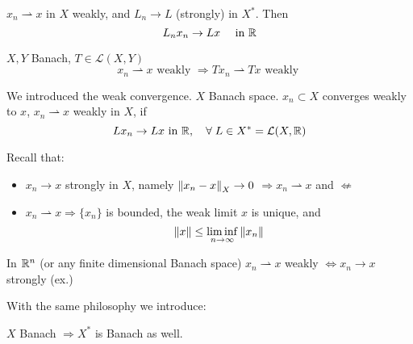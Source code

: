 \begin{proposition}
    \(x_n \rightharpoonup x \) in \(X\) weakly, and \(L_n \to L\) (strongly) in \(X^*\). Then
    \[
        L_n x_n \to Lx \quad \text{ in } \mathbb{R}
    \]
\end{proposition}
\begin{proposition}
    \(X, Y\) Banach, \(T \in \mathcal{L}(X, Y)\)
    \[
        x_n \rightharpoonup x \text{ weakly } \Rightarrow Tx_n \rightharpoonup Tx \text{ weakly }
    \]
\end{proposition}

We introduced the weak convergence. \(X\) Banach space. \({x_n} \subset X\) converges weakly to \(x\), \(x_n \rightharpoonup x\) weakly in \(X\), if 
\[
    L x_n \to Lx \text { in } \mathbb{R}, \quad \forall\; L \in X^* = \mathcal{L}(X, \mathbb{R})
\]

Recall that: 
\begin{itemize}
    \item \(x_n \to x \) strongly in \(X\), namely \(\norm{x_n - x}_X \to 0\) \(\Rightarrow x_n \rightharpoonup x\) and \(\nLeftarrow\)
    \item \(x_n \rightharpoonup x \Rightarrow \{x_n\}\) is bounded, the weak limit \(x\) is unique, and 
    \[
        \norm{x} \leq \liminf _{n \to \infty} \norm{x_n}
    \]
\end{itemize}

\begin{remark}
    In \(\mathbb{R}^n\) (or any finite dimensional Banach space) \(x_n \rightharpoonup x\) weakly \(\Leftrightarrow x_n \to x\) strongly (ex.)
\end{remark}

With the same philosophy we introduce: 
\begin{definition}
    \(X \) Banach \(\Rightarrow X^* \) is Banach as well.
\end{definition}
